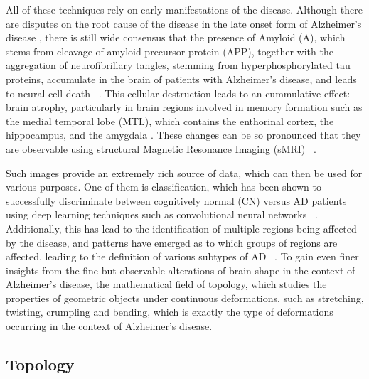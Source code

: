 \documentclass{article}
\begin{document}
All of these techniques rely on early manifestations of the disease. Although there are disputes on the root cause of the disease in the late onset form of Alzheimer's disease \citep{hur2020innate, fulop2018can, tharp2013origins}, there is still wide consensus that the presence of Amyloid \textbeta{} (A\textbeta{}), which stems from cleavage of amyloid precursor protein (APP), together with the aggregation of neurofibrillary tangles, stemming from hyperphosphorylated tau proteins, accumulate in the brain of patients with Alzheimer's disease, and leads to neural cell death ~\citep{da2016insights}. This cellular destruction leads to an cummulative effect: brain atrophy, particularly in brain regions involved in memory formation such as the medial temporal lobe (MTL), which contains the enthorinal cortex, the hippocampus, and the amygdala \citep{goedert2006century}. These changes can be so pronounced that they are observable using structural Magnetic Resonance Imaging (sMRI) ~\citep{frisoni2010clinical}.

Such images provide an extremely rich source of data, which can then be used for various purposes. One of them is classification, which has been shown to successfully discriminate between cognitively normal (CN) versus AD patients using deep learning techniques such as convolutional neural networks ~\citep{wen2020convolutional}. Additionally, this has lead to the identification of multiple regions being affected by the disease, and patterns have emerged as to which groups of regions are affected, leading to the definition of various subtypes of AD ~\citep{poulakis2018heterogeneous}. To gain even finer insights from the fine but observable alterations of brain shape in the context of Alzheimer's disease, the mathematical field of topology, which studies the properties of geometric objects under continuous deformations, such as stretching, twisting, crumpling and bending, which is exactly the type of deformations occurring in the context of Alzheimer's disease.

\subsection{Topology}
\end{document}
